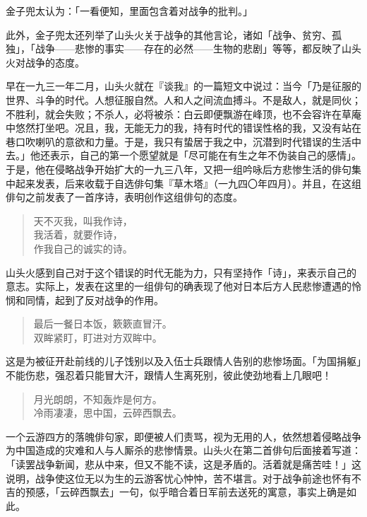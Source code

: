 {    金子兜太认为：「一看便知，里面包含着对战争的批判。」

    此外，金子兜太还列举了山头火关于战争的其他言论，诸如「战争、贫穷、孤独」，「战争——悲惨的事实——存在的必然——生物的悲剧」等等，都反映了山头火对战争的态度。

    早在一九三一年二月，山头火就在『谈我』\footnotemark[12]的一篇短文中说过：当今「乃是征服的世界、斗争的时代。人想征服自然。人和人之间流血搏斗。不是敌人，就是同伙；不胜利，就会失败；不杀人，必将被杀：白云即便飘游在峰顶，也不会容许在草庵中悠然打坐吧。况且，我，无能无力的我，持有时代的错误性格的我，又没有站在巷口吹喇叭的意欲和力量。于是，我只有蛰居于我之中，沉潜到时代错误的生活中去。」他还表示，自己的第一个愿望就是「尽可能在有生之年不伪装自己的感情」。于是，他在侵略战争开始扩大的一九三八年，又把一组吟咏后方悲惨生活的俳句集中起来发表，后来收载于自选俳句集『草木塔』（一九四〇年四月）。并且，在这组俳句之前发表了一首序诗，表明创作这组俳句的态度。


    \begin{quote}
        天不灭我，叫我作诗，\\
        我活着，就要作诗，\\
        作我自己的诚实的诗。
    \end{quote}

    山头火感到自己对于这个错误的时代无能为力，只有坚持作「诗」，来表示自己的意志。实际上，发表在这里的一组俳句的确表现了他对日本后方人民悲惨遭遇的怜悯和同情，起到了反对战争的作用。
    \begin{quote}
        最后一餐日本饭，簌簌直冒汗。\\
        双眸紧盯，盯进对方双眸中。
    \end{quote}

    这是为被征开赴前线的儿子饯别以及入伍士兵跟情人告别的悲惨场面。「为国捐躯」不能伤悲，强忍着只能冒大汗，跟情人生离死别，彼此使劲地看上几眼吧！

    \begin{quote}
        月光朗朗，不知轰炸是何方。\\
        冷雨凄凄，思中国，云碎西飘去。
    \end{quote}

    一个云游四方的落魄俳句家，即便被人们责骂，视为无用的人，依然想着侵略战争为中国造成的灾难和人与人厮杀的悲惨情景。山头火在第二首俳句后面接着写道：「读罢战争新闻，悲从中来，但又不能不读，这是矛盾的。活着就是痛苦哇！」这说明，战争使这位无以为生的云游客忧心忡忡，苦不堪言。对于战争前途也怀有不吉的预感，「云碎西飘去」一句，似乎暗合着日军前去送死的寓意，事实上确是如此。

}
